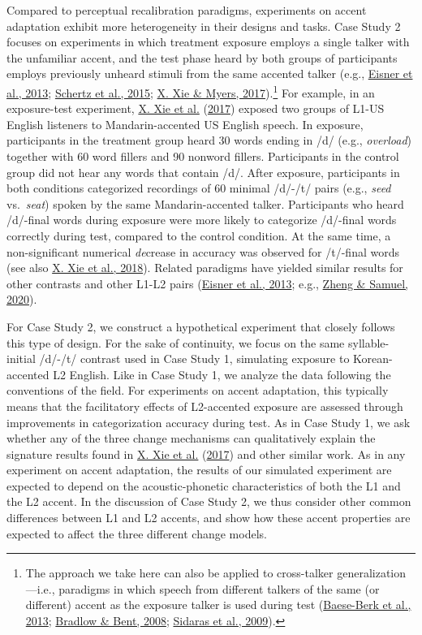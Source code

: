 \documentclass[
  11pt,
  english,
  man,floatsintext]{apa6}
\begin{document}
Compared to perceptual recalibration paradigms, experiments on accent adaptation exhibit more heterogeneity in their designs and tasks. Case Study 2 focuses on experiments in which treatment exposure employs a single talker with the unfamiliar accent, and the test phase heard by both groups of participants employs previously unheard stimuli from the same accented talker (e.g., \protect\hyperlink{ref-eisner2013}{Eisner et al., 2013}; \protect\hyperlink{ref-schertz2015}{Schertz et al., 2015}; \protect\hyperlink{ref-xie2017}{X. Xie \& Myers, 2017}).\footnote{The approach we take here can also be applied to cross-talker generalization---i.e., paradigms in which speech from different talkers of the same (or different) accent as the exposure talker is used during test (\protect\hyperlink{ref-baeseberk2013}{Baese-Berk et al., 2013}; \protect\hyperlink{ref-bradlow-bent2008}{Bradlow \& Bent, 2008}; \protect\hyperlink{ref-sidaras2009}{Sidaras et al., 2009}).} For example, in an exposure-test experiment, \protect\hyperlink{ref-xie2016jep}{X. Xie et al.} (\protect\hyperlink{ref-xie2016jep}{2017}) exposed two groups of L1-US English listeners to Mandarin-accented US English speech. In exposure, participants in the treatment group heard 30 words ending in /d/ (e.g., \emph{overload}) together with 60 word fillers and 90 nonword fillers. Participants in the control group did not hear any words that contain /d/. After exposure, participants in both conditions categorized recordings of 60 minimal /d/-/t/ pairs (e.g., \emph{seed} vs.~\emph{seat}) spoken by the same Mandarin-accented talker. Participants who heard /d/-final words during exposure were more likely to categorize /d/-final words correctly during test, compared to the control condition. At the same time, a non-significant numerical \emph{de}crease in accuracy was observed for /t/-final words (see also \protect\hyperlink{ref-xie2018lcn}{X. Xie et al., 2018}). Related paradigms have yielded similar results for other contrasts and other L1-L2 pairs (\protect\hyperlink{ref-eisner2013}{Eisner et al., 2013}; e.g., \protect\hyperlink{ref-zheng-samuel2020}{Zheng \& Samuel, 2020}).

For Case Study 2, we construct a hypothetical experiment that closely follows this type of design. For the sake of continuity, we focus on the same syllable-initial /d/-/t/ contrast used in Case Study 1, simulating exposure to Korean-accented L2 English. Like in Case Study 1, we analyze the data following the conventions of the field. For experiments on accent adaptation, this typically means that the facilitatory effects of L2-accented exposure are assessed through improvements in categorization accuracy during test. As in Case Study 1, we ask whether any of the three change mechanisms can qualitatively explain the signature results found in \protect\hyperlink{ref-xie2016jep}{X. Xie et al.} (\protect\hyperlink{ref-xie2016jep}{2017}) and other similar work. As in any experiment on accent adaptation, the results of our simulated experiment are expected to depend on the acoustic-phonetic characteristics of both the L1 and the L2 accent. In the discussion of Case Study 2, we thus consider other common differences between L1 and L2 accents, and show how these accent properties are expected to affect the three different change models.
\end{document}
